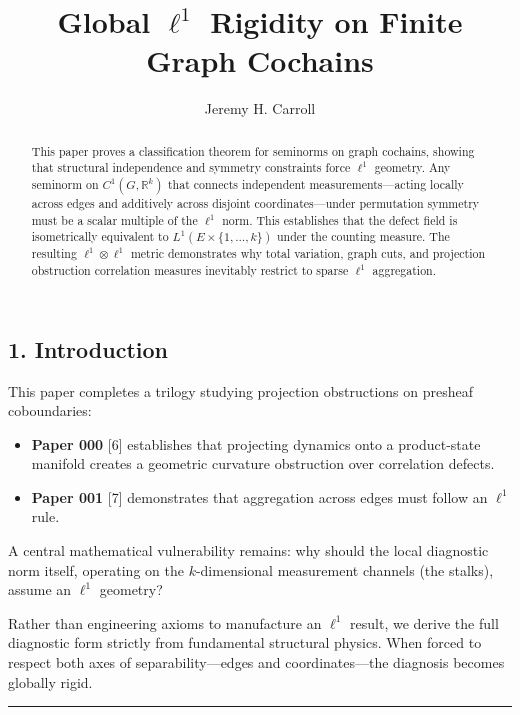 \documentclass[
]{amsart}
\title{Global \(\ell^1\) Rigidity on Finite Graph Cochains}
\author{Jeremy H. Carroll}
\date{}
\providecommand{\tightlist}{%
  \setlength{\itemsep}{0pt}\setlength{\parskip}{0pt}}
\begin{document}
\begin{abstract}
This paper proves a classification theorem for seminorms on graph
cochains, showing that structural independence and symmetry constraints
force \(\ell^1\) geometry. Any seminorm on \(C^1(G,\mathbb{R}^k)\) that connects
independent measurements---acting locally across edges and additively
across disjoint coordinates---under permutation symmetry must be a
scalar multiple of the \(\ell^1\) norm. This establishes that the defect
field is isometrically equivalent to \(L^1(E \times \{1,\dots,k\})\)
under the counting measure. The resulting \(\ell^1 \otimes \ell^1\)
metric demonstrates why total variation, graph cuts, and projection
obstruction correlation measures inevitably restrict to sparse
\(\ell^1\) aggregation.
\end{abstract}
\maketitle

\hypertarget{introduction}{%
\subsection{1. Introduction}\label{introduction}}

This paper completes a trilogy studying projection obstructions on
presheaf coboundaries:

\begin{itemize}
\tightlist
\item
  \textbf{Paper 000} {[}6{]} establishes that projecting dynamics onto a
  product-state manifold creates a geometric curvature obstruction over
  correlation defects.
\item
  \textbf{Paper 001} {[}7{]} demonstrates that aggregation across edges
  must follow an \(\ell^1\) rule.
\end{itemize}

A central mathematical vulnerability remains: why should the local
diagnostic norm itself, operating on the \(k\)-dimensional measurement
channels (the stalks), assume an \(\ell^1\) geometry?

Rather than engineering axioms to manufacture an \(\ell^1\) result, we
derive the full diagnostic form strictly from fundamental structural
physics. When forced to respect both axes of separability---edges and
coordinates---the diagnosis becomes globally rigid.

\begin{center}\rule{0.5\linewidth}{0.5pt}\end{center}
\end{document}
